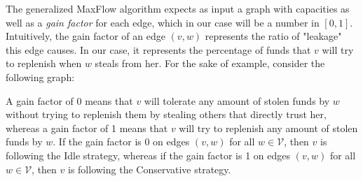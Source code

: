 The generalized MaxFlow algorithm expects as input a graph with capacities as well as a \textit{gain factor} for each edge,
which in our case will be a number in $\left[0, 1\right]$. Intuitively, the gain factor of an edge $\left(v, w\right)$
represents the ratio of "leakage" this edge causes. In our case, it represents the percentage of funds that $v$ will try to
replenish when $w$ steals from her. For the sake of example, consider the following graph:



A gain factor of 0 means that $v$ will tolerate any amount of stolen funds by $w$ without trying to replenish them by stealing
others that directly trust her, whereas a gain factor of 1 means that $v$ will try to replenish any amount of stolen funds by
$w$. If the gain factor is 0 on edges $\left(v, w\right)$ for all $w \in \mathcal{V}$, then $v$ is following the Idle
strategy, whereas if the gain factor is 1 on edges $\left(v, w\right)$ for all $w \in \mathcal{V}$, then $v$ is following the
Conservative strategy.
